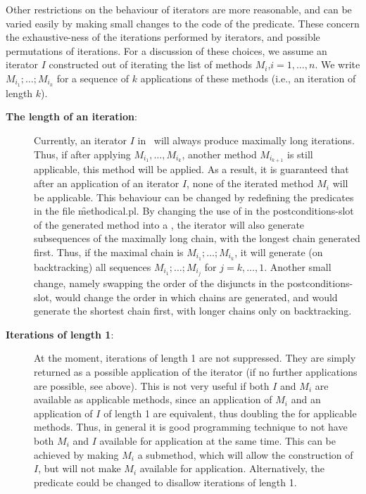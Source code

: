Other restrictions on the behaviour of iterators are more reasonable,
and can be varied easily by making small changes to the code of the
 predicate.  These concern the exhaustive-ness of
the iterations performed by iterators, and possible permutations of
iterations. For a discussion of these choices, we assume an iterator
$I$ constructed out of iterating the list of methods
$M_i$,$i=1,\ldots,n$. We write $M_{i_1};\ldots;M_{i_k}$ for a sequence
of $k$ applications of these methods (i.e., an iteration of length
$k$).
\begin{description}
\item[{\bf The length of an iteration}:]
Currently, an iterator $I$ in \clam\ will always produce maximally long
iterations. Thus, if after applying $M_{i_1},\ldots,M_{i_k}$, another
method $M_{i_{k+1}}$ is still applicable, this method will be applied.
As a result, it is guaranteed that after an application of an
iterator $I$, none of the iterated method $M_i$ will be applicable.
This behaviour can be changed by redefining the predicates
 in the file \f{methodical.pl}. By changing the use
of  in the postconditions-slot of the generated 
method into a , the iterator will also generate subsequences
of the maximally long chain, with the longest chain generated first. Thus,
if the maximal chain is $M_{i_1};\ldots;M_{i_k}$, it will generate (on
backtracking) all sequences $M_{i_1};\ldots;M_{i_j}$ for $j=k,\ldots,1$.
Another small change, namely swapping the order of the disjuncts in
the postconditions-slot, would change the order in which chains are
generated, and would generate the shortest chain first, with longer
chains only on backtracking.

\item[{\bf Iterations of length 1}:]
At the moment, iterations of length 1 are not suppressed. They are
simply returned as a possible application of the iterator (if no
further applications are possible, see above). This is not very useful
if both $I$ and $M_i$ are available as
applicable methods, since an application of $M_i$ and
an application of $I$ of length 1 are equivalent, thus doubling the
 for applicable methods. Thus, in general it is good
programming technique to not have both $M_i$ and 
$I$ available for application at the same time. This can be
achieved by making $M_i$ a submethod, which will allow
the construction of $I$, but will not make $M_i$ available for
application. Alternatively, the  predicate could
be changed to disallow iterations of length 1.


\end{description}
